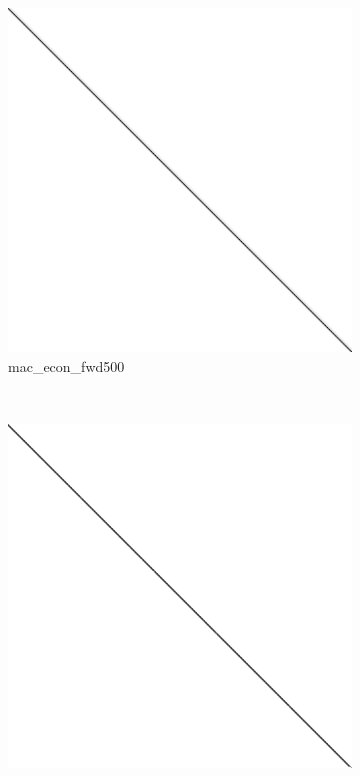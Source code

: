 \begin{figure}
\begin{multicols}{3}
\begin{subfigure}{\linewidth}
\includegraphics[width=\linewidth]{images/mac_econ_fwd500}
\caption{mac\_econ\_fwd500}
\end{subfigure}~%
\begin{subfigure}{\linewidth}
\includegraphics[width=\linewidth]{images/cant}

\end{subfigure}
\end{multicols}
\end{figure}
